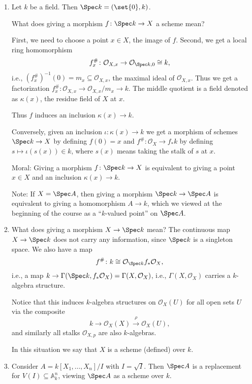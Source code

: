 \begin{enumerate}
	\item Let $k$ be a field. Then $\Spec k = (\set{0}, k)$.

		What does giving a morphism $f\colon \Spec k\to X$ a scheme mean?

		First, we need to choose a point $x \in X$, the image of $f$. Second,
		we get a local ring homomorphism
		\[ f^\#_x\colon \mathcal{O}_{X, x} \to \mathcal{O}_{\Spec k, 0} \cong k, \]
		i.e., $(f_x^\#)^{-1}(0) = m_x \subseteq \mathcal{O}_{X, x}$, the maximal
		ideal of $\mathcal{O}_{X, x}$. Thus we get a factorization
		$f^\#_x\colon \mathcal{O}_{X, x}\to \mathcal{O}_{X, x}/m_x \to k$.
		The middle quotient is a field denoted as $\kappa(x)$, the residue field
		of $X$ at $x$.

		Thus $f$ induces an inclusion $\kappa(x) \to k$.

		Conversely, given an inclusion $\iota\colon\kappa(x)\to k$ we get a morphism of
		schemes $\Spec k\to X$ by defining $f(0) = x$ and
		$f^\#\colon \mathcal{O}_X\to f_*k$ by defining $s\mapsto \iota(s(x)) \in k$,
		where $s(x)$ means taking the stalk of $s$ at $x$.

		Moral: Giving a morphism $f\colon \Spec k\to X$ is equivalent to giving
		a point $x \in X$ and an inclusion $\kappa(x)\to k$.

		Note: If $X = \Spec A$, then giving a morphism $\Spec k \to \Spec A$ is
		equivalent to giving a homomorphism $A\to k$, which we viewed at the
		beginning of the course as a \enquote{$k$-valued point} on $\Spec A$.
	\item What does giving a morphism $X\to \Spec k$ mean? The continuous map
		$X \to \Spec k$ does not carry any information, since $\Spec k$ is
		a singleton space. We also have a map
		\[ f^\#\colon k \cong \mathcal{O}_{\Spec k} f_*\mathcal{O}_X, \]
		i.e., a map $k\to \Gamma(\Spec k, f_*\mathcal{O}_X) = \Gamma(X, \mathcal{O}_X)$,
		i.e., $\Gamma(X, \mathcal{O}_X)$ carries a $k$-algebra structure.

		Notice that this induces $k$-algebra structures on $\mathcal{O}_X(U)$
		for all open sets $U$ via the composite
		\[ k \longrightarrow \mathcal{O}_X(X) \stackrel{\rho}\longrightarrow \mathcal{O}_X(U), \]
		and similarly all stalks $\mathcal{O}_{X, p}$ are also $k$-algebras.

		In this situation we say that $X$ is a scheme (defined) over $k$.
	\item Consider $A = k[X_1, \ldots, X_n]/I$ with $I = \sqrt{I}$. Then
		$\Spec A$ is a replacement for $V(I) \subseteq \mathbb{A}^n_k$, viewing
		$\Spec A$ as a scheme over $k$.


\end{enumerate}
